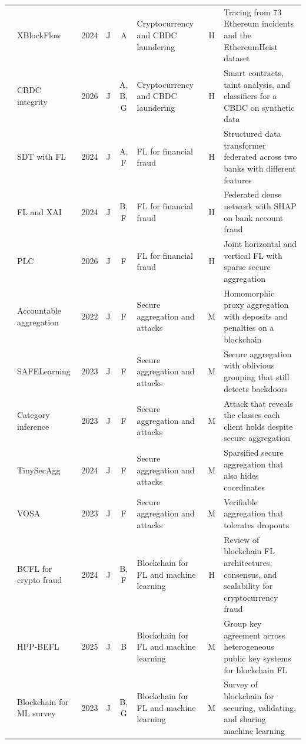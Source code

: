 \documentclass[journal]{IEEEtran}
\begin{document}
\begin{table}[!t]
\begin{tabularx}{\textwidth}{@{}L{0.7cm}L{2.45cm}cccL{3.0cm}cY@{}}
\midrule
\cite{wu2024heists} & XBlockFlow & 2024 & J & A & Cryptocurrency and CBDC laundering & H & Tracing from 73 Ethereum incidents and the EthereumHeist dataset\\
\cite{amber2026cbdc} & CBDC integrity & 2026 & J & A, B, G & Cryptocurrency and CBDC laundering & H & Smart contracts, taint analysis, and classifiers for a CBDC on synthetic data\\
\midrule
\cite{tang2024sdt} & SDT with FL & 2024 & J & A, F & FL for financial fraud & H & Structured data transformer federated across two banks with different features\\
\cite{awosika2024xai} & FL and XAI & 2024 & J & B, F & FL for financial fraud & H & Federated dense network with SHAP on bank account fraud\\
\cite{li2026plc} & PLC & 2026 & J & F & FL for financial fraud & H & Joint horizontal and vertical FL with sparse secure aggregation\\
\midrule
\cite{yang2022accountable} & Accountable aggregation & 2022 & J & F & Secure aggregation and attacks & M & Homomorphic proxy aggregation with deposits and penalties on a blockchain\\
\cite{zhang2023safelearning} & SAFELearning & 2023 & J & F & Secure aggregation and attacks & M & Secure aggregation with oblivious grouping that still detects backdoors\\
\cite{gao2023category} & Category inference & 2023 & J & F & Secure aggregation and attacks & M & Attack that reveals the classes each client holds despite secure aggregation\\
\cite{sami2024tinysecagg} & TinySecAgg & 2024 & J & F & Secure aggregation and attacks & M & Sparsified secure aggregation that also hides coordinates\\
\cite{wang2023vosa} & VOSA & 2023 & J & F & Secure aggregation and attacks & M & Verifiable aggregation that tolerates dropouts\\
\midrule
\cite{ahmed2024bcfl} & BCFL for crypto fraud & 2024 & J & B, F & Blockchain for FL and machine learning & H & Review of blockchain FL architectures, consensus, and scalability for cryptocurrency fraud\\
\cite{xiong2025hppbefl} & HPP-BEFL & 2025 & J & B & Blockchain for FL and machine learning & M & Group key agreement across heterogeneous public key systems for blockchain FL\\
\cite{ural2023bcml} & Blockchain for ML survey & 2023 & J & B, G & Blockchain for FL and machine learning & M & Survey of blockchain for securing, validating, and sharing machine learning\\

\end{tabularx}
\end{table}
\end{document}
